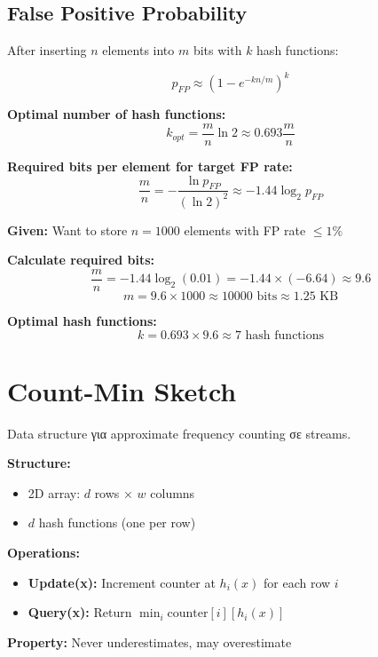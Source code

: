 \subsection{False Positive Probability}

\begin{formulabox}
After inserting $n$ elements into $m$ bits with $k$ hash functions:

\[
p_{FP} \approx \left(1 - e^{-kn/m}\right)^k
\]

\textbf{Optimal number of hash functions:}
\[
k_{opt} = \frac{m}{n} \ln 2 \approx 0.693 \frac{m}{n}
\]

\textbf{Required bits per element for target FP rate:}
\[
\frac{m}{n} = -\frac{\ln p_{FP}}{(\ln 2)^2} \approx -1.44 \log_2 p_{FP}
\]
\end{formulabox}

\begin{examplebox}
\textbf{Given:} Want to store $n = 1000$ elements with FP rate $\leq 1\%$

\textbf{Calculate required bits:}
\[
\frac{m}{n} = -1.44 \log_2(0.01) = -1.44 \times (-6.64) \approx 9.6
\]
\[
m = 9.6 \times 1000 \approx 10000 \text{ bits} \approx 1.25 \text{ KB}
\]

\textbf{Optimal hash functions:}
\[
k = 0.693 \times 9.6 \approx 7 \text{ hash functions}
\]
\end{examplebox}

\section{Count-Min Sketch}

\begin{definitionbox}
Data structure για approximate frequency counting σε streams.

\textbf{Structure:}
\begin{itemize}
    \item 2D array: $d$ rows × $w$ columns
    \item $d$ hash functions (one per row)
\end{itemize}

\textbf{Operations:}
\begin{itemize}
    \item \textbf{Update(x):} Increment counter at $h_i(x)$ for each row $i$
    \item \textbf{Query(x):} Return $\min_i \text{counter}[i][h_i(x)]$
\end{itemize}

\textbf{Property:} Never underestimates, may overestimate
\end{definitionbox}

